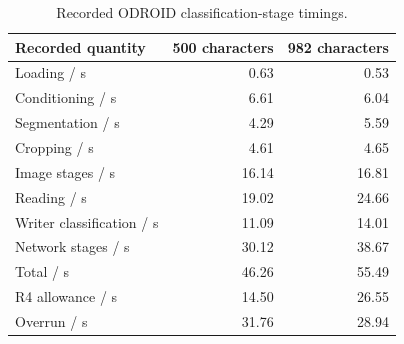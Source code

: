 \begin{table}[!htbp]\centering\small
\begin{tabular}{lrr}\toprule
\textbf{Recorded quantity} & \textbf{500 characters} & \textbf{982 characters}\\\midrule
Loading / s & 0.63 & 0.53\\
Conditioning / s & 6.61 & 6.04\\
Segmentation / s & 4.29 & 5.59\\
Cropping / s & 4.61 & 4.65\\
Image stages / s & 16.14 & 16.81\\
Reading / s & 19.02 & 24.66\\
Writer classification / s & 11.09 & 14.01\\
Network stages / s & 30.12 & 38.67\\
Total / s & 46.26 & 55.49\\
R4 allowance / s & 14.50 & 26.55\\
Overrun / s & 31.76 & 28.94\\
\bottomrule\end{tabular}
\caption{Recorded ODROID classification-stage timings.}\label{tab:res-r4-times}
\end{table}
